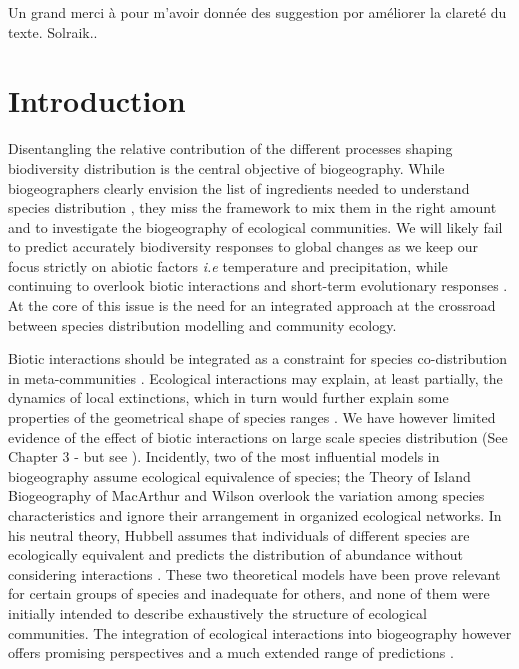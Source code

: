 Un grand merci à pour m'avoir donnée des suggestion por améliorer la clareté du texte. Solraik..
\section{Introduction}\label{introduction}

Disentangling the relative contribution of the different processes
shaping biodiversity distribution is the central objective of
biogeography. While biogeographers clearly envision the list of
ingredients needed to understand species distribution
\citep{Thuiller2013}, they miss the framework to mix them in the right
amount and to investigate the biogeography of ecological communities. We
will likely fail to predict accurately biodiversity responses to global
changes as we keep our focus strictly on abiotic factors \emph{i.e}
temperature and precipitation, while continuing to overlook biotic
interactions \citep{Wiens2011} and short-term evolutionary responses
\citep{Lavergne2010}. At the core of this issue is the need for an
integrated approach at the crossroad between species distribution
modelling and community ecology.

Biotic interactions should be integrated as a constraint for species
co-distribution in meta-communities \citep{Jabot2012, Cazelles2015a}.
Ecological interactions may explain, at least partially, the dynamics of
local extinctions, which in turn would further explain some properties
of the geometrical shape of species ranges \citep[\emph{e.g.} nested
distributions of parasitoid and its host,][]{Shenbrot2007}. We have
however limited evidence of the effect of biotic interactions on large
scale species distribution (See Chapter 3 - but see
\citet{Gotelli2010}). Incidently, two of the most influential models in
biogeography assume ecological equivalence of species; the Theory of
Island Biogeography of MacArthur and Wilson \citep[hereafter
TIB,][]{MacArthur1967} overlook the variation among species
characteristics and ignore their arrangement in organized ecological
networks. In his neutral theory, Hubbell assumes that individuals of
different species are ecologically equivalent and predicts the
distribution of abundance without considering interactions
\citep{Hubbell1997}. These two theoretical models have been prove
relevant for certain groups of species and inadequate for others, and
none of them were initially intended to describe exhaustively the
structure of ecological communities. The integration of ecological
interactions into biogeography however offers promising perspectives and
a much extended range of predictions \citep{Holt2010, Gravel2011}.

